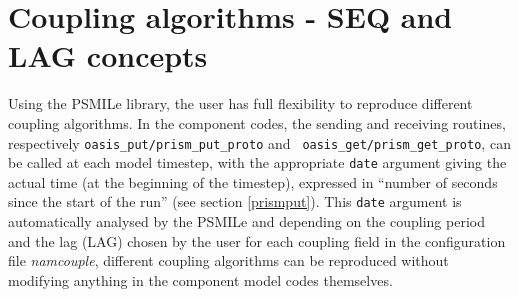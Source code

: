 %
%
%


\section{Coupling algorithms - SEQ and LAG concepts}
\label{subsubsec_Algoritms}

Using the PSMILe library, the user has full flexibility to reproduce
different coupling algorithms. In the component codes, the sending and
receiving routines, respectively {\tt oasis\_put/prism\_put\_proto} and {\tt
   oasis\_get/prism\_get\_proto}, can be called at each model timestep, with the
appropriate {\tt date} argument giving the actual time (at the
beginning of the timestep), expressed in ``number of seconds since the
start of the run'' (see section \ref{prismput}). This {\tt date} argument is automatically analysed
by the PSMILe
and depending on the coupling period and the lag (LAG) chosen by the 
user for each coupling field in the configuration file {\it namcouple}, different
coupling algorithms can be reproduced without modifying anything in the
component model codes themselves. 

